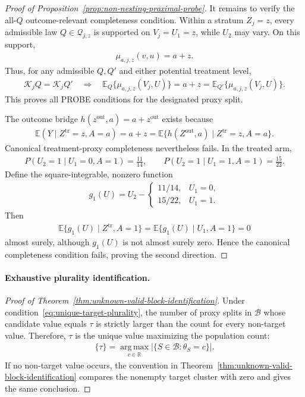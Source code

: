 \begin{proof}[Proof of Proposition~\ref{prop:non-nesting-proximal-probe}]
It remains to verify the all-$Q$ outcome-relevant completeness condition. Within a stratum $Z_j=z$, every admissible law $Q\in\mathcal Q_{j,z}$ is supported on $V_j=U_1=z$, while $U_2$ may vary. On this support,
\begin{align*}
\mu_{a,j,z}(v,u)=a+z.
\end{align*}
Thus, for any admissible $Q,Q'$ and either potential treatment level,
\begin{align*}
\mathcal K_jQ=\mathcal K_jQ'
\quad\Longrightarrow\quad
\mathbb E_Q\{\mu_{a,j,z}(V_j,U)\}
=a+z
=\mathbb E_{Q'}\{\mu_{a,j,z}(V_j,U)\}.
\end{align*}
This proves all PROBE conditions for the designated proxy split.

The outcome bridge $h(z^{\mathrm{out}},a)=a+z^{\mathrm{out}}$ exists because
\begin{align*}
\mathbb E(Y\mid Z^{\mathrm{tr}}=z,A=a)
=a+z
=\mathbb E\{h(Z^{\mathrm{out}},a)\mid Z^{\mathrm{tr}}=z,A=a\}.
\end{align*}
Canonical treatment-proxy completeness nevertheless fails. In the treated arm,
\begin{align*}
P(U_2=1\mid U_1=0,A=1)=\frac{11}{14},
\qquad
P(U_2=1\mid U_1=1,A=1)=\frac{15}{22}.
\end{align*}
Define the square-integrable, nonzero function
\begin{align*}
g_1(U)
=
U_2-
\begin{cases}
11/14,&U_1=0,\\
15/22,&U_1=1.
\end{cases}
\end{align*}
Then
\begin{align*}
\mathbb E\{g_1(U)\mid Z^{\mathrm{tr}},A=1\}
=
\mathbb E\{g_1(U)\mid U_1,A=1\}
=0
\end{align*}
almost surely, although $g_1(U)$ is not almost surely zero. Hence the canonical completeness condition fails, proving the second direction.
\end{proof}

\paragraph{Exhaustive plurality identification.}
\begin{proof}[Proof of Theorem~\ref{thm:unknown-valid-block-identification}]
Under condition~\eqref{eq:unique-target-plurality}, the number of proxy splits in $\mathcal B$ whose candidate value equals $\tau$ is strictly larger than the count for every non-target value. Therefore, $\tau$ is the unique value maximizing the population count:
\begin{align*}
\{\tau\}
=
\underset{c\in\mathbb R}{\operatorname{arg\,max}}
\bigl|\{S\in\mathcal B:\theta_S=c\}\bigr|.
\end{align*}
If no non-target value occurs, the convention in Theorem~\ref{thm:unknown-valid-block-identification} compares the nonempty target cluster with zero and gives the same conclusion.
\end{proof}

